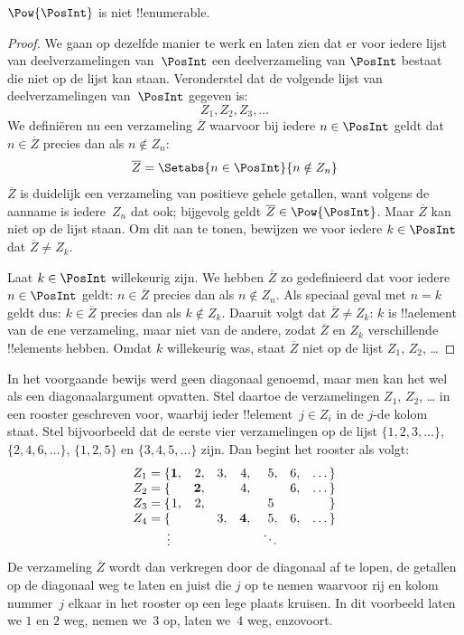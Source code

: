 \documentclass[openany]{memoir}
\begin{document}
\begin{thm}
$\Pow{\PosInt}$ is niet !!{enumerable}.
\end{thm}

\begin{proof}
We gaan op dezelfde manier te werk en laten zien dat er voor iedere
lijst van deelverzamelingen van~$\PosInt$ een deelverzameling van
$\PosInt$ bestaat die niet op de lijst kan staan. Veronderstel dat de
volgende lijst van deelverzamelingen van~$\PosInt$ gegeven is:
\[
Z_{1}, Z_{2}, Z_{3}, \dots
\]
We definiëren nu een verzameling $\overline{Z}$ waarvoor bij iedere
$n \in \PosInt$ geldt dat $n \in \overline{Z}$ precies dan als $n
\notin Z_{n}$:
\[
\overline{Z} = \Setabs{n \in \PosInt}{n \notin Z_n}
\]
$\overline{Z}$ is duidelijk een verzameling van positieve gehele
getallen, want volgens de aanname is iedere~$Z_n$ dat ook; bijgevolg
geldt $\overline{Z} \in \Pow{\PosInt}$. Maar $\overline{Z}$ kan niet op
de lijst staan. Om dit aan te tonen, bewijzen we voor iedere $k \in
\PosInt$ dat $\overline{Z} \neq Z_k$.

Laat $k \in \PosInt$ willekeurig zijn. We hebben $\overline{Z}$ zo
gedefinieerd dat voor iedere $n \in \PosInt$ geldt: $n \in
\overline{Z}$ precies dan als $n \notin Z_n$. Als speciaal geval met
$n=k$ geldt dus: $k \in \overline{Z}$ precies dan als $k \notin Z_k$.
Daaruit volgt dat $\overline{Z} \neq Z_k$: $k$ is !!a{element} van de
ene verzameling, maar niet van de andere, zodat $\overline{Z}$ en $Z_k$
verschillende !!{element}s hebben. Omdat $k$ willekeurig was, staat
$\overline{Z}$ niet op de lijst $Z_1$, $Z_2$, \dots
\end{proof}

\begin{explain}
In het voorgaande bewijs werd geen diagonaal genoemd, maar men kan het
wel als een diagonaalargument opvatten. Stel daartoe de verzamelingen
$Z_1$, $Z_2$, \dots{} in een rooster geschreven voor, waarbij ieder
!!{element}~$j \in Z_i$ in de $j$-de kolom staat. Stel bijvoorbeeld dat
de eerste vier verzamelingen op de lijst $\{1,2,3,\dots\}$, $\{2, 4, 6,
\dots\}$, $\{1,2,5\}$ en $\{3,4,5,\dots\}$ zijn. Dan begint het rooster
als volgt:
\[
\begin{array}{r@{}rrrrrrr}
  Z_1 = \{ & \mathbf{1}, & 2, & 3, & 4, & 5, & 6, & \dots\}\\
  Z_2 = \{ &  & \mathbf{2}, &  & 4, &  & 6, & \dots\}\\
  Z_3 = \{ & 1, & 2, &  &  & 5\phantom{,} &  & \}\\
  Z_4 = \{ &  &  & 3, & \mathbf{4}, & 5, & 6, & \dots\}\\
  \vdots & & & & & \ddots
\end{array}
\]
De verzameling $\overline{Z}$ wordt dan verkregen door de diagonaal af
te lopen, de getallen op de diagonaal weg te laten en juist die $j$ op
te nemen waarvoor rij en kolom nummer~$j$ elkaar in het rooster op een
lege plaats kruisen. In dit voorbeeld laten we $1$ en $2$ weg, nemen
we~$3$ op, laten we~$4$ weg, enzovoort.
\end{explain}
\end{document}
